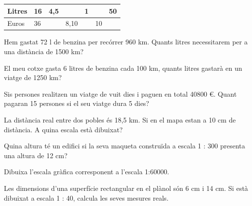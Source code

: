\begin{mylist}
\begin{center}
\begin{tabular}[]{@{}p{1cm}|p{1cm}|p{1cm}|p{1cm}|p{1cm}|p{1cm}|p{1cm}@{}}
\toprule
Litres & 16 & 4,5 & & 1 & & 50\tabularnewline
\midrule
Euros & 36 & & 8,10 & & 10 &\tabularnewline
\bottomrule
\end{tabular}
\end{center}



\exer
  Hem gastat 72 l de benzina per recórrer 960 km. Quants litres
  necessitarem per a una distància de 1500 km?
  
  
  
\exer
  El meu cotxe gasta 6 litres de benzina cada 100 km, quants litres
  gastarà en un viatge de 1250 km?


\exer
  Sis persones realitzen un viatge de vuit dies i paguen en total 40800
  \euro{}. Quant pagaran 15 persones si el seu viatge dura 5 dies?


\exer
  La distància real entre dos pobles és 18,5 km. Si en el mapa estan a
  10 cm de distància. A quina escala està dibuixat?


\exer
  Quina altura té un edifici si la seva maqueta construïda a escala 1 :
  300 presenta una altura de 12 cm?



\exer
  Dibuixa l'escala gràfica corresponent a l'escala 1:60000.


\exer
  Les dimensions d'una superfície rectangular en el plànol són 6 cm i 14
  cm. Si està dibuixat a escala 1 : 40, calcula les seves mesures reals.



\end{mylist}

